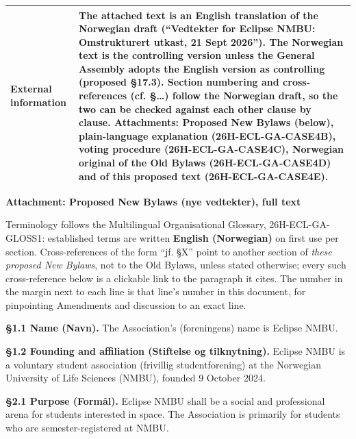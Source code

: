 \documentclass{../../../Common/Latex/Templates/rapport}
\begin{document}
\begin{tabularx}{\textwidth}{|>{\bfseries\raggedright\arraybackslash}p{4.2cm}|X|}
  \hline
  External information & The attached text is an English translation of the Norwegian draft (``Vedtekter for Eclipse NMBU: Omstrukturert utkast, 21 Sept 2026''). The Norwegian text is the controlling version unless the General Assembly adopts the English version as controlling (proposed \S17.3). Section numbering and cross-references (cf. \S\ldots) follow the Norwegian draft, so the two can be checked against each other clause by clause. Attachments: Proposed New Bylaws (below), plain-language explanation (26H-ECL-GA-CASE4B), voting procedure (26H-ECL-GA-CASE4C), Norwegian original of the Old Bylaws (26H-ECL-GA-CASE4D) and of this proposed text (26H-ECL-GA-CASE4E). \\
  \hline
\end{tabularx}
\endgroup

\newpage
\begin{center}
  {\Large\bfseries Attachment: Proposed New Bylaws (nye vedtekter), full text}\par
\end{center}
\tableofcontents

Terminology follows the Multilingual Organisational Glossary, 26H-ECL-GA-GLOSS1: established terms are written \textbf{English (Norwegian)} on first use per section. Cross-references of the form ``jf. \S X'' point to another section of \emph{these proposed New Bylaws}, not to the Old Bylaws, unless stated otherwise; every such cross-reference below is a clickable link to the paragraph it cites. The number in the margin next to each line is that line's number in this document, for pinpointing Amendments and discussion to an exact line.

\linenumbers


\label{bylaw:1}
\textbf{\S 1.1 Name (Navn).}\label{bylaw:1.1} The Association's (foreningens) name is Eclipse NMBU.

\textbf{\S 1.2 Founding and affiliation (Stiftelse og tilknytning).}\label{bylaw:1.2} Eclipse NMBU is a voluntary student association (frivillig studentforening) at the Norwegian University of Life Sciences (NMBU), founded 9 October 2024.

\label{bylaw:2}
\textbf{\S 2.1 Purpose (Formål).}\label{bylaw:2.1} Eclipse NMBU shall be a social and professional arena for students interested in space. The Association is primarily for students who are semester-registered at NMBU.
\end{document}
